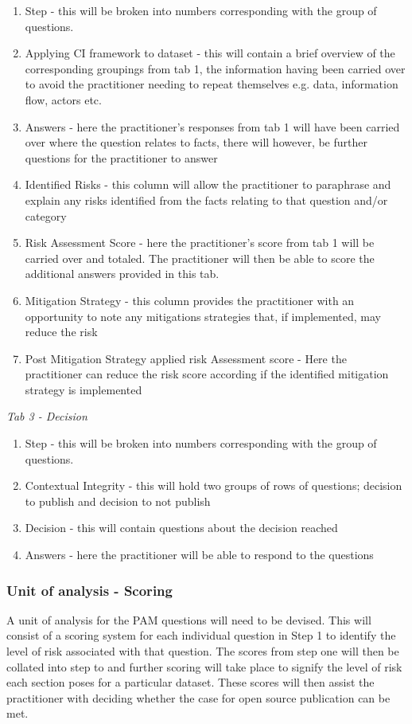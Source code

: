  \begin{enumerate}
\item Step - this will be broken into numbers corresponding with the group of questions. 
\item Applying CI framework to dataset - this will contain a brief overview of the corresponding groupings from tab 1, the information having been carried over to avoid the practitioner needing to repeat themselves e.g. data, information flow, actors etc.
\item Answers - here the practitioner's responses from tab 1 will have been carried over where the question relates to facts, there will however, be further questions for the practitioner to answer 
\item Identified Risks - this column will allow the practitioner to paraphrase  and explain any risks identified from the facts relating to that question and/or category
\item Risk Assessment Score - here the practitioner's score from tab 1 will be carried over and totaled. The practitioner will then be able to score the additional answers provided in this tab.
\item Mitigation Strategy - this column provides the practitioner with an opportunity to note any mitigations strategies that, if implemented, may reduce the risk
\item Post Mitigation Strategy applied risk Assessment score - Here the practitioner can reduce the risk score according if the identified mitigation strategy is implemented
\end {enumerate}

{\it Tab 3 - Decision}
\begin{enumerate}
\item Step - this will be broken into numbers corresponding with the group of questions. 
\item Contextual Integrity - this will hold two groups of rows of questions; decision to publish and decision to not publish
\item Decision - this will contain questions about the decision reached 
\item Answers - here the practitioner will be able to respond to the questions
\end {enumerate}

\subsubsection {Unit of analysis - Scoring}
A unit of analysis for the PAM questions will need to be devised. This will consist of a scoring system for each individual question in Step 1 to identify the level of risk associated with that question. The scores from step one will  then be collated into step to and further scoring will take place to signify the level of risk each section poses for a particular dataset. These scores will then assist the practitioner with deciding whether the case for open source publication can be met. 

